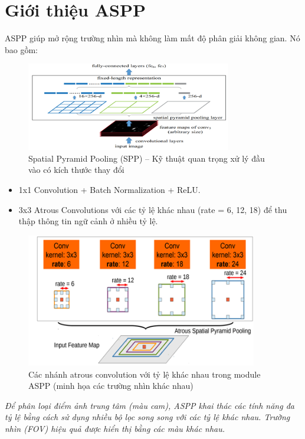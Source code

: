 \documentclass[12pt]{report}
\begin{document}
\section*{Giới thiệu ASPP}

ASPP giúp mở rộng trường nhìn mà không làm mất độ phân giải không gian. Nó bao gồm:

\begin{figure}[h]
    \centering
    \includegraphics[width=0.8\textwidth]{aspp.png}
    \caption{Spatial Pyramid Pooling (SPP) – Kỹ thuật quan trọng xử lý đầu vào có kích thước thay đổi}
\end{figure}

\begin{itemize}
    \item 1x1 Convolution + Batch Normalization + ReLU.
    \item 3x3 Atrous Convolutions với các tỷ lệ khác nhau (rate = 6, 12, 18) để thu thập thông tin ngữ cảnh ở nhiều tỷ lệ.
\end{itemize}

\begin{figure}[h]
    \centering
    \includegraphics[width=0.9\textwidth]{mau_cam.png}
    \caption{Các nhánh atrous convolution với tỷ lệ khác nhau trong module ASPP (minh họa các trường nhìn khác nhau)}
\end{figure}

\textit{Để phân loại điểm ảnh trung tâm (màu cam), ASPP khai thác các tính năng đa tỷ lệ bằng cách sử dụng nhiều bộ lọc song song với các tỷ lệ khác nhau. Trường nhìn (FOV) hiệu quả được hiển thị bằng các màu khác nhau.}
\end{document}
